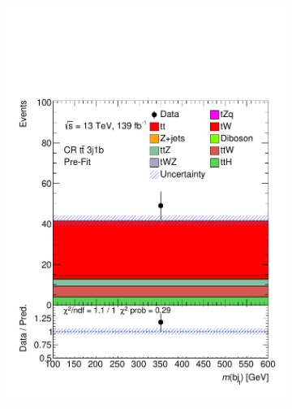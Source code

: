 \begin{figure}[!h]
\begin{subfigure}[b]{0.33\linewidth}
    \includegraphics[width=\textwidth]{ubonn-thesis/Chapters/Chapters_07/Figure/Data/CR_3j1b.pdf} 
    \caption{}
  \end{subfigure}%
  \newline
  \hspace*{-1.5cm}
  \begin{subfigure}[b]{0.33\linewidth}

\end{subfigure}
\end{figure}
